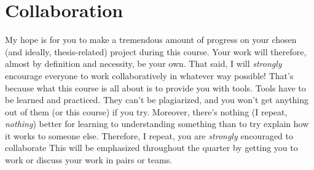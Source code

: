 \documentclass[10pt]{article}
\begin{document}
\section*{Collaboration}
My hope is for you to make a tremendous amount of progress on your chosen (and ideally, thesis-related) project during this course.
Your work will therefore, almost by definition and necessity, be your own.
That said, I will \textit{strongly} encourage everyone to work collaboratively in whatever way possible!
That's because what this course is all about is to provide you with tools.
Tools have to be learned and practiced.
They can't be plagiarized, and you won't get anything out of them (or this course) if you try.
Moreover, there's nothing (I repeat, \textit{nothing}) better for learning to understanding something than to try explain how it works to someone else.
Therefore, I repeat, you are \textit{strongly} encouraged to collaborate
This will be emphasized throughout the quarter by getting you to work or discuss your work in pairs or teams.

\end{document}
